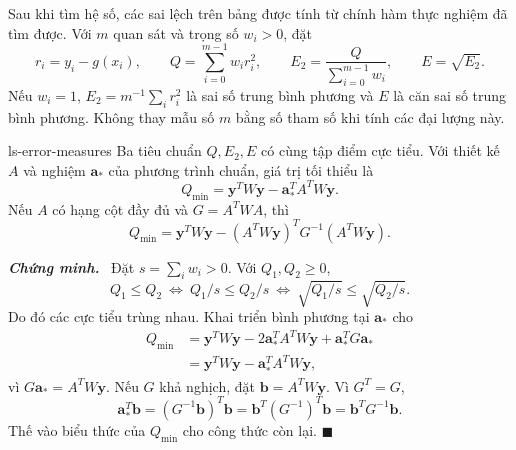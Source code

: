 \documentclass[12pt,a4paper,oneside]{book}
\numberwithin{algorithm}{chapter}
\theoremstyle{definition}
\newenvironment{chungminh}{\par\medskip\noindent\textbf{\textit{\color{mainblue}Chứng minh.}}\ }{\hfill$\blacksquare$\par\medskip}
\begin{document}
Sau khi tìm hệ số, các sai lệch trên bảng được tính từ chính hàm thực nghiệm đã tìm được. Với $m$ quan sát và trọng số $w_i>0$, đặt
\begin{equation}\label{eq:ls-mean-square-error}
 r_i=y_i-g(x_i),\qquad
 Q=\sum_{i=0}^{m-1}w_ir_i^2,\qquad
 E_2=\frac{Q}{\sum_{i=0}^{m-1}w_i},\qquad E=\sqrt{E_2}.
\end{equation}
Nếu $w_i=1$, $E_2=m^{-1}\sum_i r_i^2$ là sai số trung bình phương và $E$ là căn sai số trung bình phương. Không thay mẫu số $m$ bằng số tham số khi tính các đại lượng này.
\begin{menhde}{}{ls-error-measures}
Ba tiêu chuẩn $Q,E_2,E$ có cùng tập điểm cực tiểu. Với thiết kế $A$ và nghiệm $\boldsymbol a_*$ của phương trình chuẩn, giá trị tối thiểu là
\begin{equation}\label{eq:ls-minimum-residual}
 Q_{\min}=\boldsymbol y^TW\boldsymbol y
 -\boldsymbol a_*^TA^TW\boldsymbol y.
\end{equation}
Nếu $A$ có hạng cột đầy đủ và $G=A^TWA$, thì
\[
 Q_{\min}=\boldsymbol y^TW\boldsymbol y
 -(A^TW\boldsymbol y)^TG^{-1}(A^TW\boldsymbol y).
\]
\end{menhde}
\begin{chungminh}
Đặt $s=\sum_iw_i>0$. Với $Q_1,Q_2\geq0$,
\[
 Q_1\leq Q_2\ \Longleftrightarrow\ Q_1/s\leq Q_2/s
 \ \Longleftrightarrow\ \sqrt{Q_1/s}\leq\sqrt{Q_2/s}.
\]
Do đó các cực tiểu trùng nhau. Khai triển bình phương tại $\boldsymbol a_*$ cho
\begin{align*}
 Q_{\min}
 &=\boldsymbol y^TW\boldsymbol y
 -2\boldsymbol a_*^TA^TW\boldsymbol y
 +\boldsymbol a_*^TG\boldsymbol a_*\\
 &=\boldsymbol y^TW\boldsymbol y-\boldsymbol a_*^TA^TW\boldsymbol y,
\end{align*}
vì $G\boldsymbol a_*=A^TW\boldsymbol y$. Nếu $G$ khả nghịch, đặt $\boldsymbol b=A^TW\boldsymbol y$. Vì $G^T=G$,
\[
 \boldsymbol a_*^T\boldsymbol b
 =(G^{-1}\boldsymbol b)^T\boldsymbol b
 =\boldsymbol b^T(G^{-1})^T\boldsymbol b
 =\boldsymbol b^TG^{-1}\boldsymbol b.
\]
Thế vào biểu thức của $Q_{\min}$ cho công thức còn lại.
\end{chungminh}
\end{document}
